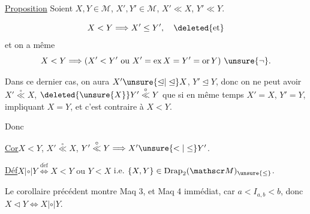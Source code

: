 \uline{Proposition} Soient $X,Y\in\mathscr M$, $X',Y'\in\mathscr M$, $X'\ll X$, $Y'\ll Y$.

 
\[
X<Y\Longrightarrow X'\leq Y',\quad\deleted{\text{et}}
\]
et on a même
\[
X<Y\Longrightarrow(X'<Y'\text{ ou }X'=\operatorname{ex}X=Y'=\operatorname{or}Y)\ \unsure{\neg}.
\]

Dans ce dernier cas, on aura $X'\unsure{\unlhd|\trianglelefteq} X$, $Y'\unlhd Y$, donc on ne peut avoir $X'\overset{\circ}{\ll}X$, $\deleted{\unsure{X}}Y'\overset{\circ}{\ll}Y$ que si en même temps $X'=X$, $Y'=Y$,    impliquant $X=Y$, et c'est  contraire à $X<Y$.

Donc

\uline{Cor}\quad $X<Y$, $X'\overset{\circ}{\ll}X$, $Y'\overset{\circ}{\ll}Y\Longrightarrow X'\unsure{<|\leq}Y'$.

\uline{Déf}\quad $X|\circ|Y\overset{\mathrm{d\acute ef}}{\Longleftrightarrow}X<Y\text{ ou }Y<X$ i.e. $\{X,Y\}\in\operatorname{Drap}_2(\mathscr M)_{\unsure{\leq}}$.

Le corollaire précédent montre Maq 3, et Maq 4 immédiat, car $a<I_{a,b}<b$, donc $X\triangleleft Y\Longleftrightarrow X|\circ|Y$.

